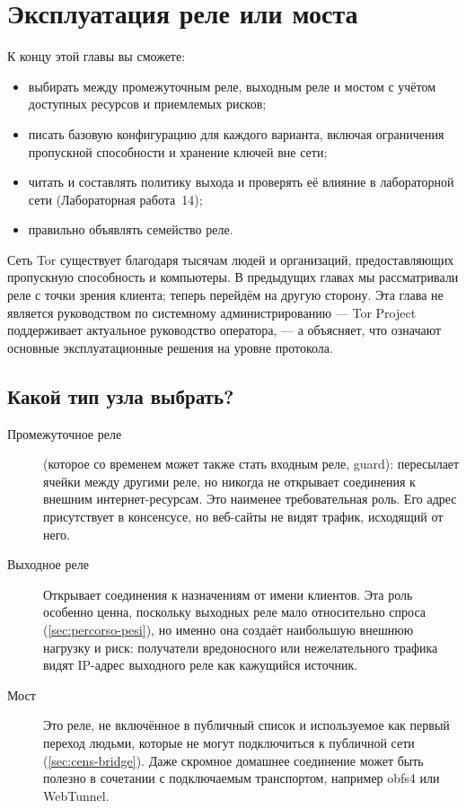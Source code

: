 \chapter{Эксплуатация реле или моста}\label{cap:22-relay}

\begin{obiettivi}
К концу этой главы вы сможете:
\begin{itemize}[nosep]
  \item выбирать между промежуточным реле, выходным реле и мостом с учётом доступных ресурсов и приемлемых рисков;
  \item писать базовую конфигурацию для каждого варианта, включая ограничения пропускной способности и хранение ключей вне сети;
  \item читать и составлять политику выхода и проверять её влияние в лабораторной сети (Лабораторная работа~14);
  \item правильно объявлять семейство реле.
\end{itemize}
\end{obiettivi}

Сеть Tor существует благодаря тысячам людей и организаций, предоставляющих пропускную способность и компьютеры. В предыдущих главах мы рассматривали реле с точки зрения клиента; теперь перейдём на другую сторону. Эта глава не является руководством по системному администрированию — Tor Project поддерживает актуальное руководство оператора, — а объясняет, что означают основные эксплуатационные решения на уровне протокола.

\section{Какой тип узла выбрать?}\label{sec:relay-tipi}

\begin{description}
  \item[Промежуточное реле] (которое со временем может также стать входным реле, guard): пересылает ячейки между другими реле, но никогда не открывает соединения к внешним интернет-ресурсам. Это наименее требовательная роль. Его адрес присутствует в консенсусе, но веб-сайты не видят трафик, исходящий от него.
  \item[Выходное реле] Открывает соединения к назначениям от имени клиентов. Эта роль особенно ценна, поскольку выходных реле мало относительно спроса (\cref{sec:percorso-pesi}), но именно она создаёт наибольшую внешнюю нагрузку и риск: получатели вредоносного или нежелательного трафика видят IP-адрес выходного реле как кажущийся источник.
  \item[Мост] Это реле, не включённое в публичный список и используемое как первый переход людьми, которые не могут подключиться к публичной сети (\cref{sec:cens-bridge}). Даже скромное домашнее соединение может быть полезно в сочетании с подключаемым транспортом, например obfs4 или WebTunnel.
\end{description}

